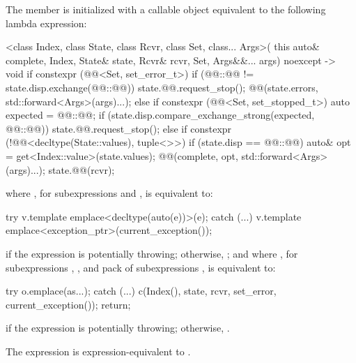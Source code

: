 \pnum
The member 
is initialized with a callable object
equivalent to the following lambda expression:
\begin{codeblock}
[]<class Index, class State, class Rcvr, class Set, class... Args>(
    this auto& complete, Index, State& state, Rcvr& rcvr, Set, Args&&... args) noexcept -> void {
  if constexpr (@@<Set, set_error_t>) {
    if (@@::@@ != state.disp.exchange(@@::@@)) {
      state.@@.request_stop();
      @@(state.errors, std::forward<Args>(args)...);
    }
  } else if constexpr (@@<Set, set_stopped_t>) {
    auto expected = @@::@@;
    if (state.disp.compare_exchange_strong(expected, @@::@@)) {
      state.@@.request_stop();
    }
  } else if constexpr (!@@<decltype(State::values), tuple<>>) {
    if (state.disp == @@::@@) {
      auto& opt = get<Index::value>(state.values);
      @@(complete, opt, std::forward<Args>(args)...);
    }
  }
  state.@@(rcvr);
}
\end{codeblock}
where ,
for subexpressions  and , is equivalent to:
\begin{codeblock}
try {
  v.template emplace<decltype(auto(e))>(e);
} catch (...) {
  v.template emplace<exception_ptr>(current_exception());
}
\end{codeblock}
if the expression  is potentially throwing;
otherwise, ;
and where ,
for subexpressions , , and pack of subexpressions ,
is equivalent to:
\begin{codeblock}
try {
  o.emplace(as...);
} catch (...) {
  c(Index(), state, rcvr, set_error, current_exception());
  return;
}
\end{codeblock}
if the expression 
is potentially throwing;
otherwise, .

\pnum
The expression 
is expression-equivalent to
.

